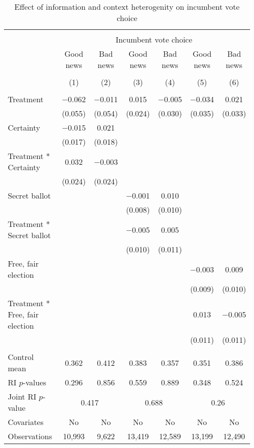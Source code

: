 
\begin{table}[!htbp] \centering 
  \caption{Effect of information and context heterogenity on incumbent vote choice} 
  \label{context_hetero} 
\begin{tabular}{@{\extracolsep{1pt}}lcccccc} 
\\[-1.8ex]\hline 
\hline \\[-1.8ex] 
 & \multicolumn{6}{c}{Incumbent vote choice} \\ 
\cline{2-7} 
 & Good news & Bad news & Good news & Bad news & Good news & Bad news \\ 
\cline{2-7}
\\[-1.8ex] & (1) & (2) & (3) & (4) & (5) & (6)\\ 
\hline \\[-1.8ex] 
 Treatment & $-$0.062 & $-$0.011 & 0.015 & $-$0.005 & $-$0.034 & 0.021 \\ 
  & (0.055) & (0.054) & (0.024) & (0.030) & (0.035) & (0.033) \\ 
  Certainty & $-$0.015 & 0.021 &  &  &  &  \\ 
  & (0.017) & (0.018) &  &  &  &  \\ 
  Treatment * Certainty & 0.032 & $-$0.003 &  &  &  &  \\ 
  & (0.024) & (0.024) &  &  &  &  \\ 
  Secret ballot &  &  & $-$0.001 & 0.010 &  &  \\ 
  &  &  & (0.008) & (0.010) &  &  \\ 
  Treatment * Secret ballot &  &  & $-$0.005 & 0.005 &  &  \\ 
  &  &  & (0.010) & (0.011) &  &  \\ 
  Free, fair election &  &  &  &  & $-$0.003 & 0.009 \\ 
  &  &  &  &  & (0.009) & (0.010) \\ 
  Treatment * Free, fair election &  &  &  &  & 0.013 & $-$0.005 \\ 
  &  &  &  &  & (0.011) & (0.011) \\ 
 \hline \\[-1.8ex] 
Control mean & 0.362 & 0.412 & 0.383 & 0.357 & 0.351 & 0.386 \\ 
RI $p$-values & 0.296 & 0.856 & 0.559 & 0.889 & 0.348 & 0.524 \\ 
Joint RI $p$-value & \multicolumn{2}{c}{0.417} & \multicolumn{2}{c}{0.688} & \multicolumn{2}{c}{0.26}\\
Covariates & No & No & No & No & No & No \\ 
Observations & 10,993 & 9,622 & 13,419 & 12,589 & 13,199 & 12,490 \\ 

\end{tabular}
\end{table}
